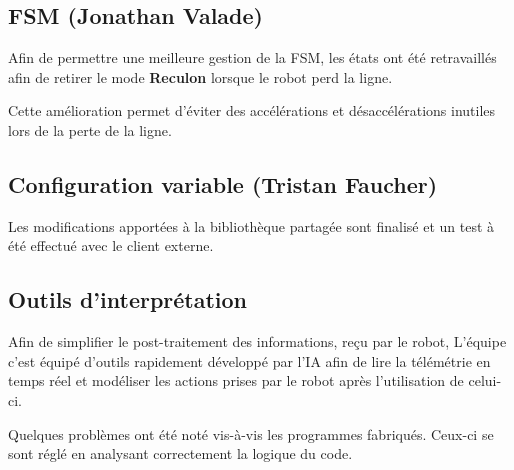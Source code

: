 \subsection{FSM (Jonathan Valade)}
Afin de permettre une meilleure gestion de la FSM, les états ont été retravaillés afin de retirer le mode \textbf{Reculon} lorsque le robot perd la ligne.

Cette amélioration permet d'éviter des accélérations et désaccélérations inutiles lors de la perte de la ligne.

\subsection{Configuration variable (Tristan Faucher)}
Les modifications apportées à la bibliothèque partagée sont finalisé et un test à été effectué avec le client externe.

\subsection{Outils d'interprétation}
Afin de simplifier le post-traitement des informations, reçu par le robot,
L'équipe c'est équipé d'outils rapidement développé par l'IA afin de lire la télémétrie en temps réel et modéliser les actions prises par le robot après l'utilisation de celui-ci.

Quelques problèmes ont été noté vis-à-vis les programmes fabriqués.
Ceux-ci se sont réglé en analysant correctement la logique du code.